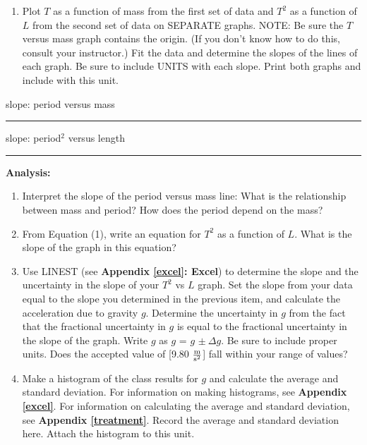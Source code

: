 \begin{enumerate}
\item Plot $T$ as a function of mass from the first set of data and $T^2$ as a function of $L$ from the second set of data on SEPARATE graphs. NOTE: Be sure the $T$ versus mass graph contains the origin. (If you don't know how to do this, consult your instructor.) Fit the data and determine the slopes of the lines of each graph. Be sure to include UNITS with each slope. Print both graphs and include with this unit.

\end{enumerate}

\vspace{10pt}

slope: period versus mass \rule{1.5in}{0.2pt}

\vspace{10pt}

slope: period$^2$ versus length \rule{1.5in}{0.2pt}

\vspace{10pt}

{\noindent \bf Analysis:}

\begin{enumerate}
\item Interpret the slope of the period versus mass line: What is the relationship between mass and period? How does the period depend on the mass? 
\vspace{20mm}

\item From Equation (1), write an equation for $T^2$ as a function of $L$. What is the slope of the graph in this equation?
\vspace{30mm}


\item Use LINEST (see \textbf{Appendix \ref{excel}: Excel}) to determine the slope and the uncertainty in the slope of your $T^2$ vs $L$ graph. Set the slope from your data equal to the slope you determined in the previous item, and calculate the acceleration due to gravity $g$. Determine the uncertainty in $g$ from the fact that the fractional uncertainty in $g$ is equal to the fractional uncertainty in the slope of the graph. Write $g$ as $g$ = $g$ \( \pm \ \Delta  g\). Be sure to include proper units. Does the accepted value of [9.80 $\frac{\rm m}{\rm s^2}$] fall within your range of values?
\vspace{30mm}

\item Make a histogram of the class results for $g$ and calculate the average and standard deviation. For information on making histograms, see \textbf{Appendix \ref{excel}}. For information on calculating the average and standard deviation, see \textbf{Appendix \ref{treatment}}. Record the average and standard deviation here. Attach the histogram to this unit.
\end{enumerate}
